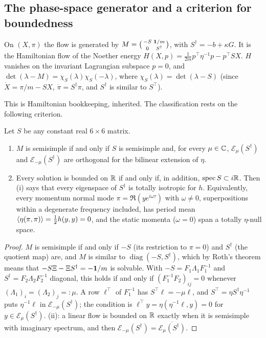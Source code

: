 \subsection{The phase-space generator and a criterion for boundedness}
\label{d4:sec:M}

\begin{lemma}[Bookkeeping]
\label{d4:lem:M}
On $(X,\pi)$ the flow is generated by $M=\bigl(\begin{smallmatrix}-S&\mathbf 1/m\\0&S^\dagger\end{smallmatrix}\bigr)$, with $S^\dagger=-b+\kappa G$. It is the
Hamiltonian flow of the Noether energy $H(X,p)=\tfrac1{2m}p^{\!\top}\eta^{-1}p-p^{\!\top}SX$. $H$ vanishes on the invariant Lagrangian subspace $p=0$,
and $\det(\lambda-M)=\chi_S(\lambda)\chi_S(-\lambda)$, where $\chi_S(\lambda)=\det(\lambda-S)$ (since $\dot X=\pi/m-SX$, $\dot\pi=S^\dagger\pi$, and
$S^\dagger$ is similar to $S^{\!\top}$).
\end{lemma}

This is Hamiltonian bookkeeping, inherited. The classification rests on the following criterion.

\begin{theorem}
\label{d4:thm:criterion}
Let $S$ be any constant real $6\times6$ matrix.
\begin{enumerate}[label=(\roman*),leftmargin=2.2em]
\item $M$ is semisimple if and only if $S$ is semisimple and, for every $\mu\in\mathbb{C}$, $\mathcal E_\mu(S^\dagger)$ and $\mathcal E_{-\mu}(S^\dagger)$ are
orthogonal for the bilinear extension of $\eta$.
\item Every solution is bounded on $\mathbb{R}$ if and only if, in addition, $\operatorname{spec} S\subset i\mathbb{R}$. Then (i) says that every eigenspace of $S^\dagger$ is totally
isotropic for $h$. Equivalently, every momentum normal mode $\pi=\Re(ye^{i\omega\tau})$ with $\omega\neq0$, superpositions within a degenerate
frequency included, has period mean $\langle\eta(\pi,\pi)\rangle=\tfrac12 h(y,y)=0$, and the static momenta ($\omega=0$) span a totally $\eta$-null space.
\end{enumerate}
\end{theorem}

\begin{proof}
$M$ is semisimple if and only if $-S$ (its restriction to $\pi=0$) and $S^\dagger$ (the quotient map) are, and $M$ is similar to
$\operatorname{diag}(-S,S^\dagger)$, which by Roth's theorem \cite{Roth52} means that $-S\Xi-\Xi S^\dagger=-\mathbf 1/m$ is solvable. With $-S=F_1\Lambda_1F_1^{-1}$
and $S^\dagger=F_2\Lambda_2F_2^{-1}$ diagonal, this holds if and only if $(F_1^{-1}F_2)_{ij}=0$ whenever $(\Lambda_1)_i=(\Lambda_2)_j=:\mu$. A row $\ell^{\!\top}$ of
$F_1^{-1}$ has $S^{\!\top}\ell=-\mu\ell$, and $S^{\!\top}=\eta S^\dagger\eta^{-1}$ puts $\eta^{-1}\ell$ in $\mathcal E_{-\mu}(S^\dagger)$; the condition is
$\ell^{\!\top}y=\eta(\eta^{-1}\ell,y)=0$ for $y\in\mathcal E_\mu(S^\dagger)$. (ii): a linear flow is bounded on $\mathbb{R}$ exactly when it is semisimple with
imaginary spectrum, and then $\mathcal E_{-\mu}(S^\dagger)=\overline{\mathcal E_\mu(S^\dagger)}$.
\end{proof}

